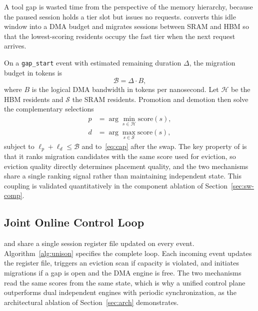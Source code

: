 A tool gap is wasted time from the perspective of the memory
hierarchy, because the paused session holds a tier slot but issues
no requests. \okt converts this idle window into a DMA budget and
migrates sessions between SRAM and HBM so that the lowest-scoring
residents occupy the fast tier when the next request arrives.

On a \texttt{gap\_start} event with estimated remaining duration
$\Delta$, the migration budget in tokens is
\begin{equation}
  \mathcal{B}=\Delta\cdot B,
  \label{eq:budget}
\end{equation}
where $B$ is the logical DMA bandwidth in tokens per nanosecond.
Let $\mathcal{H}$ be the HBM residents and $\mathcal{S}$ the SRAM
residents. Promotion and demotion then solve the complementary
selections
\begin{align}
  p
  &=\arg\min_{s\in\mathcal{H}}\mathrm{score}(s),
  \label{eq:promote}
  \\
  d
  &=\arg\max_{s\in\mathcal{S}}\mathrm{score}(s),
  \label{eq:demote}
\end{align}
subject to $\ell_p+\ell_d\le\mathcal{B}$ and to~\eqref{eq:cap} after
the swap. The key property of \okt is that it ranks migration
candidates with the same \esp score used for eviction, so eviction
quality directly determines placement quality, and the two mechanisms
share a single ranking signal rather than maintaining independent
state. This coupling is validated quantitatively in the component
ablation of Section~\ref{sec:sw-comp}.

\subsection{Joint Online Control Loop}
\label{sec:loop}

\esp and \okt share a single session register file updated on every
event. Algorithm~\ref{alg:unison} specifies the complete loop. Each
incoming event updates the register file, triggers an eviction scan
if capacity is violated, and initiates migrations if a gap is open
and the DMA engine is free. The two mechanisms read the same scores
from the same state, which is why a unified control plane
outperforms dual independent engines with periodic synchronization,
as the architectural ablation of Section~\ref{sec:arch}
demonstrates.

